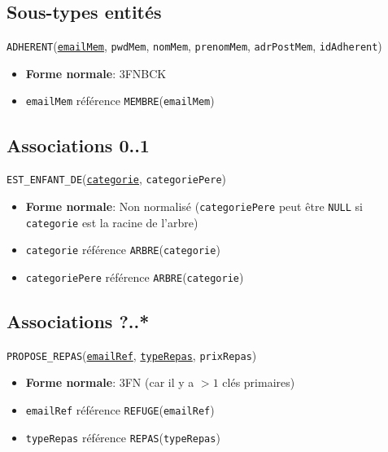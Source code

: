 \documentclass[12pt, a4paper]{article}
\newcommand\att[1]{\textnhtt{#1}}
\begin{document}
\subsection*{Sous-types entités}

\att{ADHERENT}(\att{\underline{emailMem}}, \att{pwdMem}, \att{nomMem}, \att{prenomMem}, \att{adrPostMem}, \att{idAdherent})
\begin{itemize}
\item \textbf{Forme normale}: 3FNBCK
\item \att{emailMem} référence \att{MEMBRE}(\att{emailMem})
\end{itemize}




\subsection*{Associations 0..1}

\att{EST\_ENFANT\_DE}(\att{\underline{categorie}}, \att{categoriePere})
\begin{itemize}
\item \textbf{Forme normale}: Non normalisé (\att{categoriePere} peut être \att{NULL} si \att{categorie} est la racine de l'arbre)
\item \att{categorie} référence \att{ARBRE}(\att{categorie})
\item \att{categoriePere} référence \att{ARBRE}(\att{categorie})
\end{itemize}

\subsection*{Associations ?..*}

\att{PROPOSE\_REPAS}(\att{\underline{emailRef}}, \att{\underline{typeRepas}}, \att{prixRepas})
\begin{itemize}
\item \textbf{Forme normale}: 3FN (car il y a $>1$ clés primaires)
\item \att{emailRef} référence \att{REFUGE}(\att{emailRef})
\item \att{typeRepas} référence \att{REPAS}(\att{typeRepas})
\end{itemize}
\end{document}
